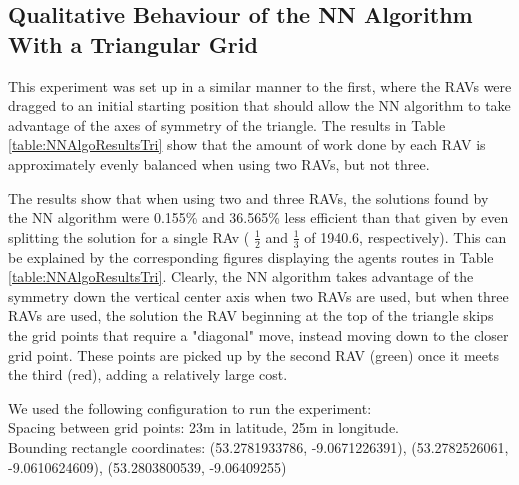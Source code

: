 \pagebreak
\subsection{Qualitative Behaviour of the NN Algorithm With a Triangular Grid}
This experiment was set up in a similar manner to the first, where the RAVs were dragged to an initial starting position that should allow the NN algorithm to take advantage of the axes of symmetry of the triangle.
The results in Table \ref{table:NNAlgoResultsTri} show that the amount of work done by each RAV is approximately evenly balanced when using two RAVs, but not three. 

The results show that when using two and three RAVs, the solutions found by the NN algorithm were 0.155\% and 36.565\% less efficient than that given by even splitting the solution for a single RAv ( $\frac{1}{2}$ and $\frac{1}{3}$ of 1940.6, respectively). This can be explained by the corresponding figures displaying the agents routes in Table \ref{table:NNAlgoResultsTri}. Clearly, the NN algorithm takes advantage of the symmetry down the vertical center axis when two RAVs are used, but when three RAVs are used, the solution the RAV beginning at the top of the triangle skips the grid points that require a "diagonal" move, instead moving down to the closer grid point. These points are picked up by the second RAV (green) once it meets the third (red), adding a relatively large cost.

We used the following configuration to run the experiment:
\\Spacing between grid points: 23m in latitude, 25m in longitude.
\\Bounding rectangle coordinates: (53.2781933786, -9.0671226391), (53.2782526061, -9.0610624609), (53.2803800539, -9.06409255)
\\

